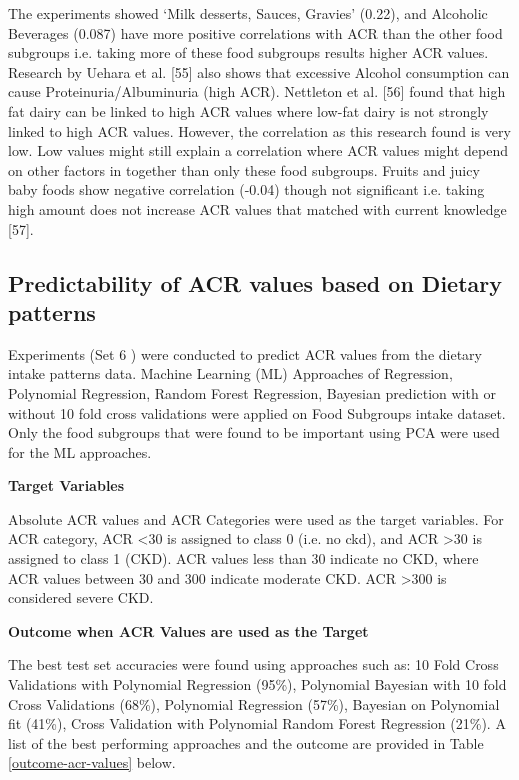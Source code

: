 \noindent The experiments showed  `Milk desserts, Sauces, Gravies' (0.22), and Alcoholic Beverages (0.087) have more positive correlations with ACR than the other food subgroups  i.e. taking more of these food subgroups results higher ACR values. Research by Uehara et al. [55] also shows that excessive Alcohol consumption can cause Proteinuria/Albuminuria (high ACR). Nettleton et al. [56] found that high fat dairy can be linked to high ACR values where low-fat dairy is not strongly linked to high ACR values. However, the correlation as this research found is very low. Low values might still explain a correlation where ACR values might depend on other factors in together than only these food subgroups. Fruits and juicy baby foods show negative correlation (-0.04) though not significant i.e. taking high amount does not increase ACR values that matched with current knowledge [57].


\subsection{Predictability of ACR values based on Dietary patterns}
Experiments (Set 6 ) were conducted to predict ACR values from the dietary intake patterns data. Machine Learning (ML) Approaches of Regression, Polynomial Regression, Random Forest Regression, Bayesian prediction with or without 10 fold cross validations were applied on Food Subgroups intake dataset. Only the food subgroups that were found to be important using PCA were used for the ML approaches.

\noindent \textbf{Target Variables}

\noindent Absolute ACR values and ACR Categories were used as the target variables.  For ACR category, ACR  \textless   30 is assigned to class 0 (i.e. no ckd), and ACR  \textgreater  30 is assigned to class 1 (CKD). ACR values less than 30 indicate no CKD, where ACR values between 30 and 300 indicate moderate CKD. ACR \textgreater 300 is considered severe CKD.

\noindent \textbf{Outcome when ACR Values are used as the Target }

\noindent The best test set accuracies were found using  approaches such as: 10 Fold Cross Validations with Polynomial Regression (95\%), Polynomial Bayesian with 10 fold Cross Validations (68\%), Polynomial Regression (57\%), Bayesian on Polynomial fit (41\%), Cross Validation with Polynomial Random Forest Regression (21\%). A list of the best performing approaches and the outcome are provided in Table \ref{outcome-acr-values} below. 

